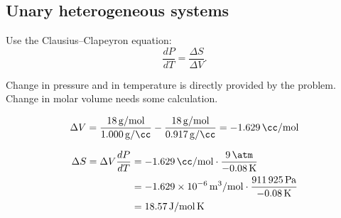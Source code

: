 \begin{@empty}
\section{Unary heterogeneous systems}
\begin{problem}
\end{problem}

\begin{problem}
\end{problem}

\begin{problem}
\end{problem}

\begin{problem}
\end{problem}

\begin{problem}
\end{problem}

\begin{problem}
\end{problem}

\begin{problem}
\end{problem}

\begin{answer}
    Use the Clausius--Clapeyron equation:
    \[ \frac{dP}{dT} = \frac{\Delta S}{\Delta V}.\]

    Change in pressure and in temperature is directly provided by the problem.
    Change in molar volume needs some calculation.

    \[
        \Delta V
        = \frac{\SI{18}{\gram/\mol}}{\SI{1.000}{\gram/\cc}}
        - \frac{\SI{18}{\gram/\mol}}{\SI{0.917}{\gram/\cc}}
        = \SI{-1.629}{\cc/\mol}
    \]

    \begin{align*}
        \Delta S = \Delta V \frac{dP}{dT}
        &= \SI{-1.629}{\cc/\mol} \cdot \frac{\SI{9}{\atm}}{\SI{-0.08}{\kelvin}} \\
        &= \SI{-1.629e-6}{\m^3/\mol} \cdot \frac{\SI{911925}{\pascal}}{\SI{-0.08}{\kelvin}} \\
        &= \SI{18.57}{\joule/\mol.\kelvin}
    \end{align*}
\end{answer}

\begin{problem}
\end{problem}
\end{@empty}
